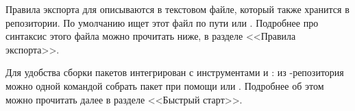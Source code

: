 Правила экспорта для  описываются в текстовом файле, который также хранится в репозитории. По умолчанию  ищет этот файл по пути  или . Подробнее про синтаксис этого файла можно прочитать ниже, в разделе <<Правила экспорта>>.

Для удобства сборки пакетов  интегрирован с инструментами  и : из -репозитория можно одной командой собрать пакет при помощи  или . Подробнее об этом можно прочитать далее в разделе <<Быстрый старт>>. 


